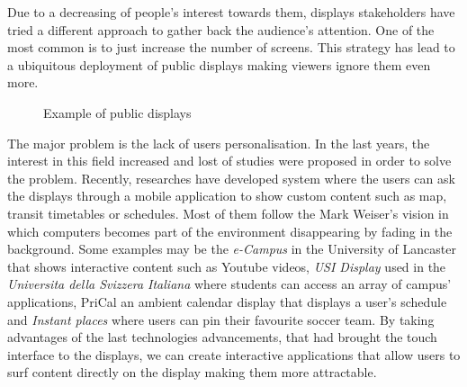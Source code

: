 \documentclass[]{usiinfbachelorproject}
\begin{document}
Due to a decreasing of people's interest towards them, displays stakeholders have tried a different approach to gather back the audience's attention. One of the most common is to just increase the number of screens. This strategy has lead to a ubiquitous deployment of public displays making viewers ignore them even more.
\begin{figure}[H]
  \centering
  \hfill
  \caption{Example of public displays}
\end{figure} 
The major problem is the lack of users personalisation. In the last years, the interest in this field increased and lost of studies were proposed in order to solve the problem. Recently, researches have developed system where the users can ask the displays through a mobile application to show custom content such as map, transit timetables or schedules. Most of them follow the Mark Weiser's \cite{the_computer_for} vision in which computers becomes part of the environment disappearing by fading in the background.
Some examples may be the \emph{e-Campus} \cite{e_campus} in the University of Lancaster that shows interactive content such as Youtube videos, \emph{USI Display} \cite{a_good_balance} used in the \emph{Universita della Svizzera Italiana} where students can access an array of campus' applications, PriCal \cite{pri_cal} an ambient calendar display that displays a user's schedule and \emph{Instant places} \cite{pins_and_posters} where users can pin their favourite soccer team.
By taking advantages of the last technologies advancements, that had brought the touch interface to the displays, we can create interactive applications that allow users to surf content directly on the display making them more attractable.
\end{document}

